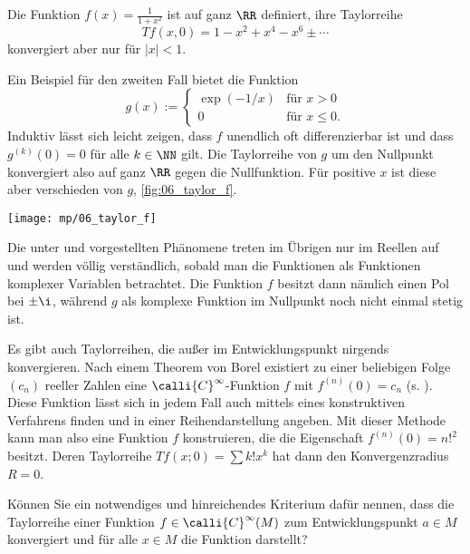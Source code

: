 \begin{antwort}
   Die Funktion $f(x)=\frac{1}{1+x^2}$ 
  ist auf ganz $\RR$ definiert, ihre Taylorreihe
  \[
  Tf(x,0)=1-x^2 + x^4 - x^6 \pm \cdots
  \]
  konvergiert aber nur für $|x| < 1$.

  \medskip
  \noindent
   Ein Beispiel für den zweiten Fall bietet die Funktion 
  \[
  g(x) := \left\{ \begin{array}{ll} 
      \exp(-1/x) & \text{für $x>0$} \\
      0          & \text{für $x\le 0$}. 
    \end{array} \right.
  \]
  Induktiv lässt sich leicht zeigen, dass $f$ 
  unendlich oft differenzierbar ist und dass 
  $g^{(k)}(0)=0$ für alle $k\in \NN$ gilt. 
  Die Taylorreihe von $g$ um den Nullpunkt konvergiert 
  also auf ganz $\RR$ gegen die Nullfunktion. 
  Für positive $x$ ist diese aber verschieden von $g$, 
  \sieheAbbildung\ref{fig:06_taylor_f}.

  \begin{center}
    \texttt{[image: mp/06\_taylor\_f]}
    \label{fig:06_taylor_f}
  \end{center}

  Die unter  und  
  vorgestellten Phänomene treten im Übrigen 
  nur im Reellen auf und werden völlig verständlich, 
  sobald man die Funktionen als Funktionen komplexer Variablen betrachtet. 
  Die Funktion $f$ besitzt dann nämlich einen Pol bei $\pm \i$, 
  während $g$ als komplexe Funktion im Nullpunkt 
  noch nicht einmal stetig ist. 

  Es gibt auch Taylorreihen, die außer im Entwicklungspunkt 
  nirgends konvergieren. Nach einem Theorem von Borel 
  existiert zu einer 
  beliebigen Folge $(c_n)$ reeller Zahlen eine $\calli{C}^\infty$-Funktion 
  $f$ mit $f^{(n)}(0)=c_n$ (s. \citep{Kaballo}). 
  Diese Funktion lässt sich in jedem Fall 
  auch mittels eines konstruktiven Verfahrens finden und in einer 
  Reihendarstellung angeben. Mit dieser Methode kann man also eine 
  Funktion $f$ konstruieren, die die Eigenschaft $f^{(n)}(0)=n!^2$ 
  besitzt. Deren Taylorreihe $Tf(x;0)=\sum k!x^k$ 
  hat dann den Konvergenzradius $R=0$. 
  \AntEnd 
\end{antwort}

\begin{frage}
  Können Sie ein notwendiges und hinreichendes Kriterium dafür nennen, 
  dass die Taylorreihe einer Funktion $f\in \calli{C}^\infty(M)$ zum 
  Entwicklungspunkt $a\in M$ konvergiert und 
  für alle $x\in M$ die Funktion darstellt?
\end{frage}


